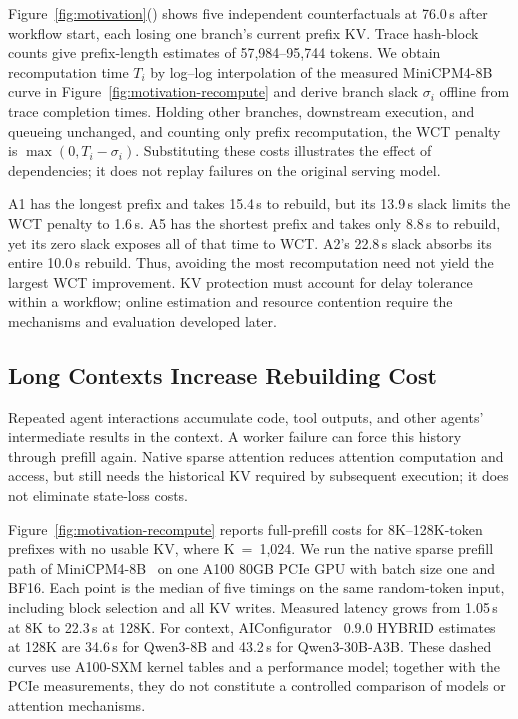 Figure~\ref{fig:motivation}() shows
five independent counterfactuals at 76.0\,s after workflow start, each
losing one branch's current prefix KV. Trace hash-block counts give
prefix-length estimates of 57,984--95,744 tokens. We obtain recomputation
time $T_i$ by log--log interpolation of the measured MiniCPM4-8B curve in
Figure~\ref{fig:motivation-recompute} and derive branch slack $\sigma_i$
offline from trace completion times. Holding other branches, downstream
execution, and queueing unchanged, and counting only prefix recomputation,
the WCT penalty is $\max(0,T_i-\sigma_i)$. Substituting these costs
illustrates the effect of dependencies; it does not replay failures on the
original serving model.

A1 has the longest prefix and takes 15.4\,s to rebuild, but its 13.9\,s
slack limits the WCT penalty to 1.6\,s. A5 has the shortest prefix and
takes only 8.8\,s to rebuild, yet its zero slack exposes all of that time
to WCT. A2's 22.8\,s slack absorbs its entire 10.0\,s rebuild. Thus, avoiding the most
recomputation need not yield the largest WCT improvement. KV protection
must account for delay tolerance within a workflow; online estimation and
resource contention require the mechanisms and evaluation developed later.

\subsection{Long Contexts Increase Rebuilding Cost}
\label{sec:motivation-long-context}



Repeated agent interactions accumulate code, tool outputs, and other
agents' intermediate results in the context. A worker failure can force
this history through prefill again. Native sparse attention reduces
attention computation and access, but still needs the historical KV
required by subsequent execution; it does not eliminate state-loss costs.

Figure~\ref{fig:motivation-recompute} reports full-prefill costs for
8K--128K-token prefixes with no usable KV, where K~=~1,024. We run the
native sparse prefill path of MiniCPM4-8B~\cite{minicpm4model} on one
A100 80GB PCIe GPU with batch size one and BF16. Each point is the median
of five timings on the same random-token input, including block selection
and all KV writes. Measured latency grows from 1.05\,s at 8K to 22.3\,s
at 128K. For context, AIConfigurator~\cite{nvidia2026aiconfigurator}
0.9.0 HYBRID estimates at 128K are 34.6\,s for Qwen3-8B and 43.2\,s for
Qwen3-30B-A3B. These dashed curves use A100-SXM kernel tables and a
performance model; together with the PCIe measurements, they do not
constitute a controlled comparison of models or attention mechanisms.

